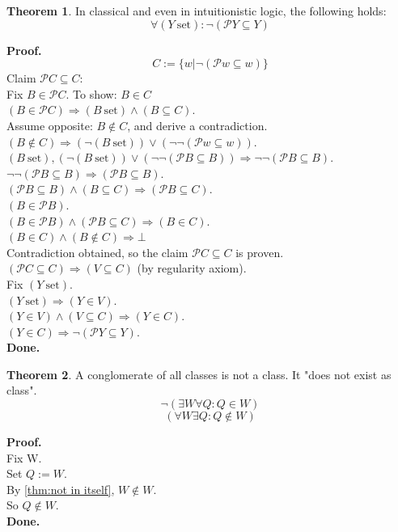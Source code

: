 \documentclass[10pt,a4paper]{article}
\theoremstyle{definition}
\newtheorem{theorem}{Theorem}[section]
\newcommand{\Done}{\noindent \textbf{Done.}\\}
\renewcommand{\iff}{\ \longleftrightarrow\ }
\newcommand{\power}{\mathcal{P}}
\newcommand{\Proof}{\noindent \textbf{Proof.}\\}
\newcommand{\set}{\mathrm{\ set}}
\begin{document}
\begin{theorem}
\label{thm:powerset not a subset}
In classical and even in intuitionistic logic, the following holds:
\[ \forall (Y\set): \neg(\power Y \subseteq Y)\]
\end{theorem}
\Proof
\noindent %
\[
C:=\{w|\neg(\power w \subseteq w)\}
\]
Claim $\power C \subseteq C$:\\
Fix $B\in \power C$. To show: $B\in C$\\
$(B\in \power C)\Longrightarrow (B\set)\land(B\subseteq C)$.\\
Assume opposite: $B\notin C$, and derive a contradiction.\\
$(B\notin C) \Longrightarrow (\neg(B\set))\lor (\neg\neg(\power w\subseteq w))$.\\
$(B\set), (\neg(B\set))\lor (\neg\neg(\power B\subseteq B)) \Longrightarrow \neg\neg(\power B\subseteq B)$.\\
$\neg\neg(\power B\subseteq B)  \Longrightarrow (\power B\subseteq B)$.\\
$ (\power B\subseteq B) \land (B\subseteq C) \Longrightarrow (\power B\subseteq C)$.\\
$(B\in \power B)$.\\
$(B\in \power B)\land (\power B\subseteq C) \Longrightarrow (B\in C)$.\\
$(B\in C) \land (B\notin C)  \Longrightarrow \bot$\\
Contradiction obtained, so the claim $\power C \subseteq C$ is proven.\\
$(\power C \subseteq C)\Longrightarrow (V\subseteq C)$ (by regularity axiom).\\
Fix $(Y\set)$.\\
$(Y\set)\Longrightarrow (Y\in V)$.\\
$(Y\in V)\land (V\subseteq C) \Longrightarrow (Y\in C)$.\\
$(Y\in C)\Longrightarrow \neg(\power Y\subseteq Y)$.\\
\Done

\begin{theorem}
\label{thm:conglomerate of classes not class}
A conglomerate of all classes is not a class. It "does not exist as class".
\[
\neg (\exists W \forall Q: Q\in W)
\]
\[
(\forall W \exists Q: Q\notin W)
\]
\end{theorem}
\Proof
Fix W.\\
Set $Q:=W$.\\
By \ref{thm:not in itself}, $W\notin W$.\\
So $Q\notin W$.\\
\Done
\end{document}
